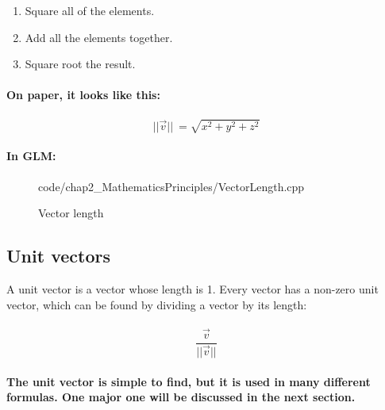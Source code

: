 \begin{enumerate}
    \large
    \item Square all of the elements.
    \item Add all the elements together.
    \item Square root the result.
\end{enumerate}

\paragraph{
    On paper, it looks like this:
}

\paragraph{
    \begin{equation*}
    ||\vec{v} ||\ =\sqrt{x^{2} +y^{2} +z^{2}}
    \end{equation*}
}

\paragraph{
    In GLM:
}

\begin{frame}{}
    \begin{figure}[ht]
    \centering
    \colorbox{backgroundcolor}{
        \parbox{0.9\textwidth}{
            
            {code/chap2_MathematicsPrinciples/VectorLength.cpp}
        }
    }
    \caption{Vector length}
    \label{fig:Vector length}
    \end{figure}
\end{frame}

\subsection{\textsf{Unit vectors}}
A unit vector is a vector whose length is 1. Every vector has a non-zero unit vector, which can be found by dividing a vector by its length:

\paragraph{
    \begin{equation*}
    \frac{\vec{v}}{||\vec{v} ||}
    \end{equation*}
}

\paragraph{
    The unit vector is simple to find, but it is used in many different formulas. One major one will be discussed in the next section.
}

